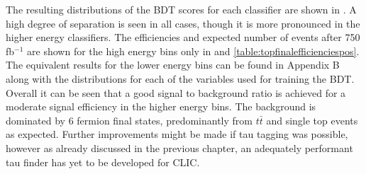 The resulting distributions of the \ac{BDT} scores for each classifier are shown in . A high degree of separation is seen in all cases, though it is more pronounced in the higher energy classifiers. The efficiencies and expected number of events after 750 fb$^{-1}$ are shown for the high energy bins only in  and \ref{table:topfinalefficienciespos}. The equivalent results for the lower energy bins can be found in Appendix B along with the distributions for each of the variables used for training the \ac{BDT}. Overall it can be seen that a good signal to background ratio is achieved for a moderate signal efficiency in the higher energy bins. The background is dominated by 6 fermion final states, predominantly from $t\bar{t}$ and single top events as expected. Further improvements might be made if tau tagging was possible, however as already discussed in the previous chapter, an adequately performant tau finder has yet to be developed for \ac{CLIC}. 


